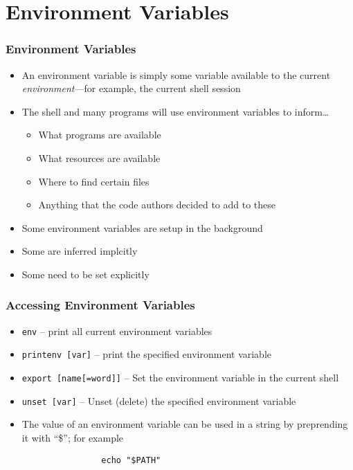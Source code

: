 \documentclass[aspectratio=169]{beamer}
\begin{document}
\section{Environment Variables}

\frame{\sectionpage}

\begin{frame}
	\frametitle{Environment Variables}
	\begin{itemize}
		\item An environment variable is simply some variable available to the current \emph{environment}---for example, the current shell session
		\item The shell and many programs will use environment variables to inform\dots
			\begin{itemize}
				\item What programs are available
				\item What resources are available
				\item Where to find certain files
				\item Anything that the code authors decided to add to these
			\end{itemize}
		\item Some environment variables are setup in the background
		\item Some are inferred implcitly
		\item Some need to be set explicitly
	\end{itemize}
\end{frame}

\begin{frame}[fragile]
	\frametitle{Accessing Environment Variables}
	\begin{itemize}
		\item \texttt{env} -- print all current environment variables
		\item \texttt{printenv [var]} -- print the specified environment variable
		\item \texttt{export [name[=word]]} -- Set the environment variable in the current shell
		\item \texttt{unset [var]} -- Unset (delete) the specified environment variable
		\item The value of an environment variable can be used in a string by preprending it with ``\$''; for example
			\begin{verbatim}
				echo "$PATH"
			\end{verbatim}
	\end{itemize}
\end{frame}
\end{document}
